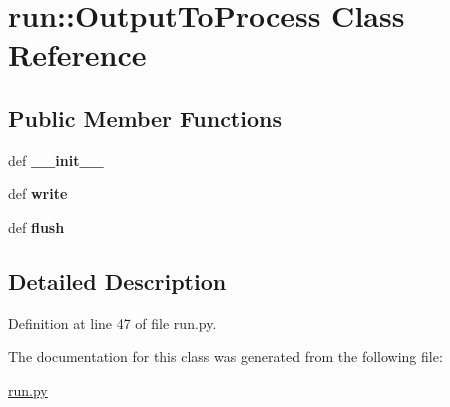 \hypertarget{classrun_1_1_output_to_process}{
\section{run\-:\-:\-Output\-To\-Process \-Class \-Reference}
\label{classrun_1_1_output_to_process}
}
\subsection*{\-Public \-Member \-Functions}
\begin{DoxyCompactItemize}
\item 
\hypertarget{classrun_1_1_output_to_process_af4b910d56f5d16d282d78b3892a9f577}{
def {\bfseries \-\_\-\-\_\-init\-\_\-\-\_\-}}
\label{classrun_1_1_output_to_process_af4b910d56f5d16d282d78b3892a9f577}

\item 
\hypertarget{classrun_1_1_output_to_process_a5d58ed362339ad81afdf48a5e4a7e147}{
def {\bfseries write}}
\label{classrun_1_1_output_to_process_a5d58ed362339ad81afdf48a5e4a7e147}

\item 
\hypertarget{classrun_1_1_output_to_process_a337465ad525251dfab4bd1fb569e3bf7}{
def {\bfseries flush}}
\label{classrun_1_1_output_to_process_a337465ad525251dfab4bd1fb569e3bf7}

\end{DoxyCompactItemize}


\subsection{\-Detailed \-Description}


\-Definition at line 47 of file run.\-py.



\-The documentation for this class was generated from the following file\-:\begin{DoxyCompactItemize}
\item 
\hyperlink{run_8py}{run.\-py}\end{DoxyCompactItemize}
